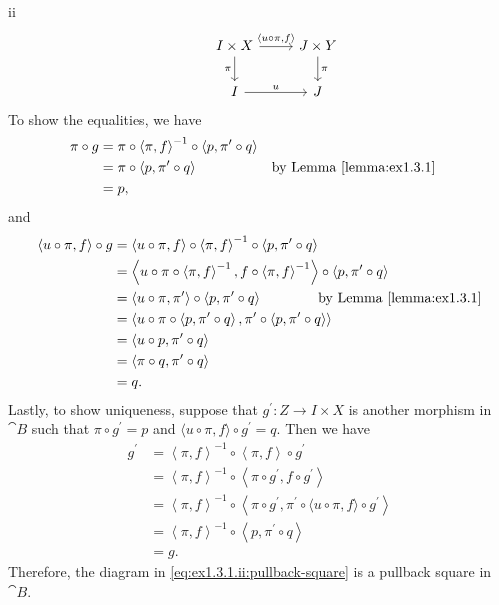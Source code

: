\begin{partsolution}{ii}
\begin{equation*}
\begin{tikzcd}[row sep=small]
& I \times X \arrow[r, "{\left\langle u\circ\pi, f\right\rangle}"] \arrow[dd, "\pi"{left}]
& J \times Y \arrow[dd, "\pi"] \\ \\
& I \arrow[r, "u"]
& J
\end{tikzcd}
\end{equation*}
To show the equalities, we have
\begin{align*}
\pi \circ g
&= \pi \circ \left\langle\pi,f\right\rangle^{-1} \circ \left\langle p, \pi^\prime \circ q\right\rangle \\
&= \pi \circ \left\langle p, \pi^\prime \circ q\right\rangle & &\text{by Lemma~\ref{lemma:ex1.3.1}} \\
&= p,
\end{align*}
and
\begin{align*}
\langle u\circ\pi, f\rangle \circ g
&= \left\langle u\circ\pi, f\right\rangle \circ \left\langle\pi,f\right\rangle^{-1} \circ \left\langle p, \pi^\prime \circ q\right\rangle \\
&= \left\langle u\circ\pi\circ\left\langle\pi,f\right\rangle^{-1}, f\circ\left\langle\pi,f\right\rangle^{-1}\right\rangle \circ \left\langle p, \pi^\prime \circ q\right\rangle \\
&= \left\langle u\circ\pi, \pi^\prime\right\rangle \circ \left\langle p, \pi^\prime \circ q\right\rangle \qquad\qquad\text{by Lemma~\ref{lemma:ex1.3.1}} \\
&= \left\langle u\circ\pi \circ \left\langle p, \pi^\prime \circ q\right\rangle, \pi^\prime \circ \left\langle p, \pi^\prime \circ q\right\rangle\right\rangle \\
&= \left\langle u\circ p, \pi^\prime \circ q\right\rangle \\
&= \left\langle \pi\circ q, \pi^\prime \circ q\right\rangle \\
&= q.
\end{align*}
Lastly, to show uniqueness, suppose that \(g^\prime : Z \to I \times X\) is another morphism in \(\cat{B}\) such that \(\pi \circ g^\prime = p\) and \(\langle u\circ\pi, f\rangle \circ g^\prime = q\).
Then we have
\begin{align*}
g^\prime
&= \left\langle\pi,f\right\rangle^{-1} \circ \left\langle\pi,f\right\rangle \circ g^\prime \\
&= \left\langle\pi,f\right\rangle^{-1} \circ \left\langle \pi \circ g^\prime, f \circ g^\prime\right\rangle \\
&= \left\langle\pi,f\right\rangle^{-1} \circ \left\langle \pi \circ g^\prime, \pi^\prime \circ \langle u\circ\pi, f\rangle \circ g^\prime\right\rangle \\
&= \left\langle\pi,f\right\rangle^{-1} \circ \left\langle p, \pi^\prime \circ q\right\rangle \\
&= g.
\end{align*}
Therefore, the diagram in \eqref{eq:ex1.3.1.ii:pullback-square} is a pullback square in \(\cat{B}\).
\end{partsolution}
